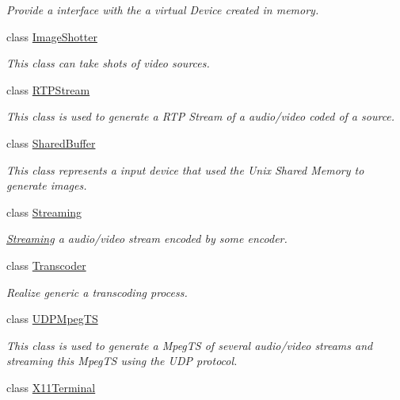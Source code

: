 \begin{DoxyCompactItemize}
\begin{DoxyCompactList}\small\item\em Provide a interface with the a virtual Device created in memory. \item\end{DoxyCompactList}\item 
class \hyperlink{classbr_1_1ufscar_1_1lince_1_1xpta_1_1streaming_1_1ImageShotter}{ImageShotter}
\begin{DoxyCompactList}\small\item\em This class can take shots of video sources. \item\end{DoxyCompactList}\item 
class \hyperlink{classbr_1_1ufscar_1_1lince_1_1xpta_1_1streaming_1_1RTPStream}{RTPStream}
\begin{DoxyCompactList}\small\item\em This class is used to generate a RTP Stream of a audio/video coded of a source. \item\end{DoxyCompactList}\item 
class \hyperlink{classbr_1_1ufscar_1_1lince_1_1xpta_1_1streaming_1_1SharedBuffer}{SharedBuffer}
\begin{DoxyCompactList}\small\item\em This class represents a input device that used the Unix Shared Memory to generate images. \item\end{DoxyCompactList}\item 
class \hyperlink{classbr_1_1ufscar_1_1lince_1_1xpta_1_1streaming_1_1Streaming}{Streaming}
\begin{DoxyCompactList}\small\item\em \hyperlink{classbr_1_1ufscar_1_1lince_1_1xpta_1_1streaming_1_1Streaming}{Streaming} a audio/video stream encoded by some encoder. \item\end{DoxyCompactList}\item 
class \hyperlink{classbr_1_1ufscar_1_1lince_1_1xpta_1_1streaming_1_1Transcoder}{Transcoder}
\begin{DoxyCompactList}\small\item\em Realize generic a transcoding process. \item\end{DoxyCompactList}\item 
class \hyperlink{classbr_1_1ufscar_1_1lince_1_1xpta_1_1streaming_1_1UDPMpegTS}{UDPMpegTS}
\begin{DoxyCompactList}\small\item\em This class is used to generate a MpegTS of several audio/video streams and streaming this MpegTS using the UDP protocol. \item\end{DoxyCompactList}\item 
class \hyperlink{classbr_1_1ufscar_1_1lince_1_1xpta_1_1streaming_1_1X11Terminal}{X11Terminal}
\end{DoxyCompactItemize}
